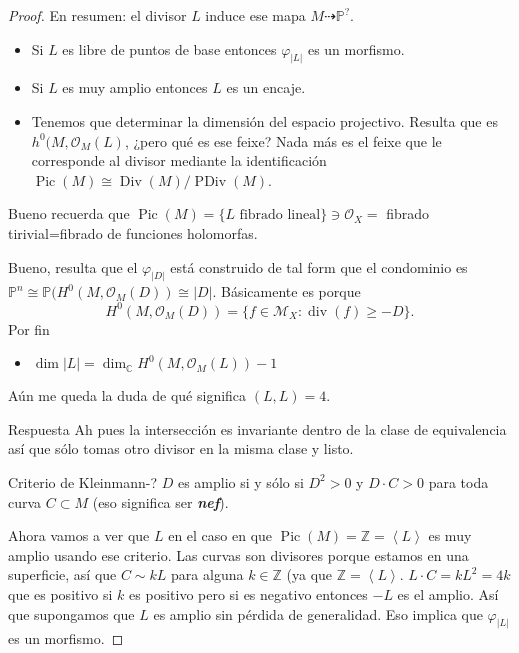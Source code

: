 \begin{proof}
En resumen: el divisor $L$ induce ese mapa  $M\dashrightarrow \mathbb{P}^?$.
\begin{itemize}
\item Si $L$ es libre de puntos de base entonces  $\varphi_{|L|}$ es un morfismo.
\item Si $L$ es muy amplio entonces $L$ es un encaje.
\item Tenemos que determinar la dimensión del espacio projectivo. Resulta que es $h^0(M,\mathcal{O}_M(L)$, ¿pero qué es ese feixe? Nada más es el feixe que le corresponde al divisor mediante la identificación $\operatorname{Pic}(M) \cong \operatorname{Div}(M)/\operatorname{PDiv}(M)$.
\end{itemize}
	\begin{remark}\leavevmode
		Bueno recuerda que $\operatorname{Pic} (M) =\{\text{$L$ fibrado lineal} \} \ni \mathcal{O}_X=$ fibrado tirivial=fibrado de funciones holomorfas.		
	\end{remark}
Bueno, resulta que el $\varphi_{|D|}$ está construido de tal form que el condominio es $\mathbb{P}^n\cong \mathbb{P}(H^{0}(M,\mathcal{O}_M(D))\cong |D|$. Básicamente es porque
\[H^{0}(M,\mathcal{O}_M(D))=\{ f \in\mathcal{M}_{X}:\operatorname{div}(f)\geq -D\}.\]
Por fin
\begin{itemize}
\item $\dim |L| =\dim_{\mathbb{C}}H^{0}(M,\mathcal{O}_M(L))-1$
\end{itemize}
\begin{question}\leavevmode
	Aún me queda la duda de qué significa  $(L,L)=4$.
\end{question}
\begin{thing5}{Respuesta}\leavevmode
	Ah pues la intersección es invariante dentro de la clase de equivalencia así que sólo tomas otro divisor en la misma clase y listo.
\end{thing5}

\begin{thing4}{Criterio de Kleinmann-?}\leavevmode
	$D$ es amplio si y s\'olo si $D^2>0$ y $D\cdot C>0$ para toda curva $C\subset M$ (eso significa ser \textit{\textbf{nef}}).
\end{thing4}

Ahora vamos a ver que $L$ en el caso en que $\operatorname{Pic}(M) =\mathbb{Z}=\left<L\right> $ es muy amplio usando ese criterio. Las curvas son divisores porque estamos en una superficie, así que $C\sim kL$ para alguna $k\in\mathbb{Z}$ (ya que $\mathbb{Z}=\left<L\right> $. $L\cdot C=kL^2=4k$ que es positivo si $k$ es positivo pero si es negativo entonces $-L$ es el amplio.  Así que supongamos que $L$ es amplio sin pérdida de generalidad. Eso implica que $\varphi_{|L|}$ es un morfismo.


\end{proof}
